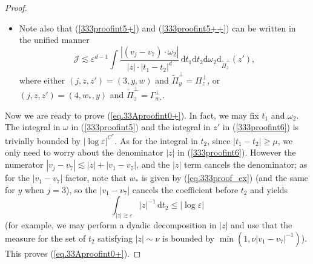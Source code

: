\documentclass[10pt, reqno]{amsart}
\newcommand{\dirac}{\boldsymbol{\delta}}
\newcommand {\Jc}{\mathcal J}
\theoremstyle{definition}
\theoremstyle{remark}
\numberwithin{equation}{section}
\begin{document}
\begin{proof}
\begin{itemize}
\begin{equation}\label{eq.333proof_ex}w=w_*+\frac{\varepsilon\omega}{t_1-t_2},\quad w_*:=\frac{x_1-x_7+t_2(v_1-v_7)-\varepsilon\omega_2}{t_1-t_2},\end{equation} and note that $|w|\sim|w_*|\gg \mu^{-1}\varepsilon$ by our assumption. Now we use the second expression in (\ref{eq.33Aproofint1}), and write
\[\dirac(y\cdot w)\,\mathrm{d}y=|w_*|^{-1}\dirac\bigg(\frac{w_*}{|w_*|}\cdot y+\lambda|y|\bigg);\quad \lambda:=\frac{\varepsilon}{(t_1-t_2)\cdot|w_*|}\,(|\lambda|\ll 1).\] Note that the $\dirac$ function is comparable to the Hausdorff measure on the cone $\frac{w_*}{|w_*|}\cdot y+\lambda|y|=0$. We denote this cone (or two rays if $d=2$) by $\Gamma_{w_*}^\perp$ and its Huausdorff measure by $\mathrm{d}_{\Gamma_{w_*}^\perp}(y)$, which is bounded on bounded sets. This leads to
\begin{equation}\label{333proofint5++}
\Jc\lesssim \varepsilon^{d-1}\int\frac{|(v_4-v_7)\cdot \omega_2|}{|w_*|\cdot|t_1-t_2|^{d}} \,\mathrm{d}t_1\mathrm{d}t_2 \mathrm{d}\omega_2\mathrm{d}_{\Gamma_{w_*}^\perp}(y).
\end{equation}
\item Note also that (\ref{333proofint5+}) and (\ref{333proofint5++}) can be written in the unified manner
\begin{equation}\label{333proofint6}
\Jc\lesssim \varepsilon^{d-1}\int\frac{|(v_j-v_7)\cdot \omega_2|}{|z|\cdot|t_1-t_2|^{d}} \,\mathrm{d}t_1\mathrm{d}t_2 \mathrm{d}\omega_2\mathrm{d}_{\widetilde{\Pi}_{z}^\perp}(z'),
\end{equation} where either $(j,z,z')=(3,y,w)$ and $\widetilde{\Pi}_y^\perp=\Pi_z^\perp$, or $(j,z,z')=(4,w_*,y)$ and $\widetilde{\Pi}_{z}^\perp=\Gamma_{w_*}^\perp$.
\end{itemize}

Now we are ready to prove (\ref{eq.33Aproofint0+}). In fact, we may fix $t_1$ and $\omega_2$. The integral in $\omega$ in (\ref{333proofint5}) and the integral in $z'$ in (\ref{333proofint6}) is trivially bounded by $|\log\varepsilon|^{C^*}$. As for the integral in $t_2$, since $|t_1-t_2|\geq\mu$, we only need to worry about the denominator $|z|$ in (\ref{333proofint6}). However the numerator $|v_j-v_7|\lesssim|z|+|v_1-v_7|$, and the $|z|$ term cancels the denominator; as for the $|v_1-v_7|$ factor, note that $w_*$ is given by (\ref{eq.333proof_ex}) (and the same for $y$ when $j=3$), so the $|v_1-v_7|$ cancels the coefficient before $t_2$ and yields
\[\int_{|z|\gtrsim\varepsilon}|z|^{-1}\,\mathrm{d}t_2\leq |\log\varepsilon|\] (for example, we may perform a dyadic decomposition in $|z|$ and use that the measure for the set of $t_2$ satisfying $|z|\sim\nu$ is bounded by $\min(1,\nu|v_1-v_7|^{-1})$). This proves (\ref{eq.33Aproofint0+}).


\end{proof}
\end{document}
